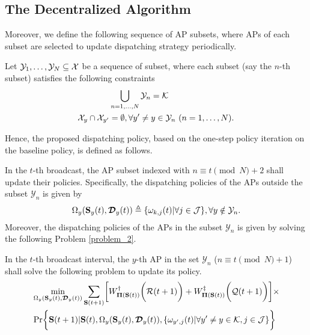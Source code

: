 \subsection{The Decentralized Algorithm}
\label{subsec:ap_alg}
Moreover, we define the following sequence of AP subsets, where APs of each subset are selected to update dispatching strategy periodically.
\begin{definition}
    Let $\mathcal{Y}_{1}, \dots, \mathcal{Y}_{N} \subseteq \mathcal{X}$ be a sequence of subset, where each subset (say the $n$-th subset) satisfies the following constraints
    \begin{align}
        &\bigcup_{n=1,\dots,N} \mathcal{Y}_{n} = \mathcal{K}
        \\
        \mathcal{X}_{y} \cap \mathcal{X}_{y'} &=\emptyset, \forall y' \neq y \in \mathcal{Y}_{n}~(n=1,\dots,N).
    \end{align}
\end{definition}

Hence, the proposed dispatching policy, based on the one-step policy iteration on the baseline policy, is defined as follows.
\begin{definition}
    In the $t$-th broadcast, the AP subset indexed with $n \equiv t \pmod{N} + 2$ shall update their policies.
    Specifically, the dispatching policies of the APs outside the subset $\mathcal{Y}_{n}$ is given by
    \begin{align}
        \Omega_{y}( \mathbf{S}_{y}(t),\boldsymbol{\mathcal{D}}_{y}(t) ) \triangleq \{ \omega_{k,j}(t) | \forall j\in\mathcal{J} \}, \forall y\notin\mathcal{Y}_{n}.
    \end{align}
    Moreover, the dispatching policies of the APs in the subset $\mathcal{Y}_{n}$ is given by solving the following Problem \ref{problem_2}.
\end{definition}

\begin{problem}
    In the $t$-th broadcast interval, the $y$-th AP in the set $\mathcal{Y}_{n}$ ($n \equiv t \pmod{N} + 1$) shall solve the following problem to update its policy.
    {\tiny
    \begin{align}
        &\min_{ \Omega_{y}(\Stat_{y}(t), \Delay_{y}(t)) }
        \sum_{\Stat(t+1)} \Bracket{
            W^{\dagger}_{\Baseline(\Stat(t))} \Paren{\mathcal{R}(t+1)} + W^{\ddagger}_{\Baseline(\Stat(t))}\Paren{\mathcal{Q}(t+1)}
        } \times
        \nonumber\\
        &\Pr\Brace{
            \Stat(t+1) | \Stat(t), \Omega_{y}(\Stat_{y}(t), \Delay_{y}(t)), \set{\omega_{y',j}(t)|\forall y' \neq y \in\apSet, j\in\jSpace}
        }
    \end{align}
    }
    \label{problem_2}
\end{problem}

